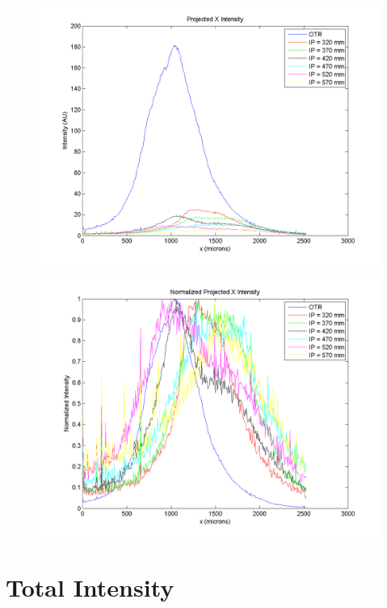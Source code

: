 \documentclass[12pt]{article}
\begin{document}
\begin{figure}
\begin{center}
\includegraphics[scale=0.5]{Figures/XProj_ODR.PNG}
\caption{}
\end{center}
\end{figure}

\begin{figure}
\begin{center}
\includegraphics[scale=0.5]{Figures/XProj_Norm_ODR.PNG}
\caption{}
\end{center}
\end{figure}


\newpage

\section{Total Intensity}
\end{document}
